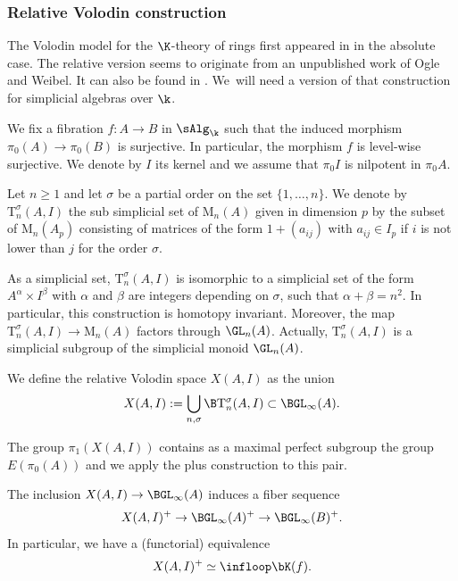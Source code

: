 \subsubsection{Relative Volodin construction}
The Volodin model for the $\K$-theory of rings first appeared in \cite{volodin:ktheory} in the absolute case. The relative version seems to originate from an unpublished work of Ogle and Weibel. It can also be found in \cite{loday:hc}. We~will need a version of that construction for simplicial algebras over $\k$.

We fix a fibration $f \colon A \to B$ in $\sAlg_\k$ such that the induced morphism $\pi_0(A) \to \pi_0(B)$ is surjective. In particular, the morphism $f$ is level-wise surjective. We denote by $I$ its kernel and we assume that $\pi_0I$ is nilpotent in $\pi_0A$.
\begin{df}
Let $n \geq 1$ and let $\sigma$ be a partial order on the set $\{1, \dots, n\}$. We denote by $\mathrm{T}^\sigma_n(A,I)$ the sub simplicial set of $\mathrm{M}_n(A)$ given in dimension $p$ by the subset of $\mathrm{M}_n(A_p)$ consisting of matrices of the form $1+(a_{ij})$ with $a_{ij} \in I_p$ if $i$ is not lower than $j$ for the order $\sigma$.
\end{df}

As a simplicial set, $\mathrm{T}^\sigma_n(A,I)$ is isomorphic to a simplicial set of the form $A^\alpha \times I^\beta$ with $\alpha$ and $\beta$ are integers depending on $\sigma$, such that $\alpha + \beta = n^2$. In particular, this construction is homotopy invariant.
Moreover, the map $\mathrm{T}^\sigma_n(A,I) \to \mathrm{M}_n(A)$ factors through $\GL_n(A)$. Actually, $\mathrm{T}^\sigma_n(A,I)$ is a simplicial subgroup of the simplicial monoid $\GL_n(A)$.

\begin{df}
We define the relative Volodin space $X(A,I)$ as the union\vspace*{-3pt}
\[
X(A,I) := \bigcup_{n, \sigma} \B\mathrm{T}^\sigma_n(A,I) \subset \BGL_\infty(A).
\]
\end{df}
\noindent The group $\pi_1(X(A,I))$ contains as a maximal perfect subgroup the group $E(\pi_0(A))$ and we apply the plus construction to this pair.

\begin{prop}
The inclusion $X(A,I) \to \BGL_\infty(A)$ induces a fiber sequence\vspace*{-3pt}
\[
X(A,I)^+ \to \BGL_\infty(A)^+ \to \BGL_\infty(B)^+.
\]
In particular, we have a (functorial) equivalence\vspace*{-3pt}
\[
X(A,I)^+ \simeq \infloop \bK(f).
\]
\end{prop}

